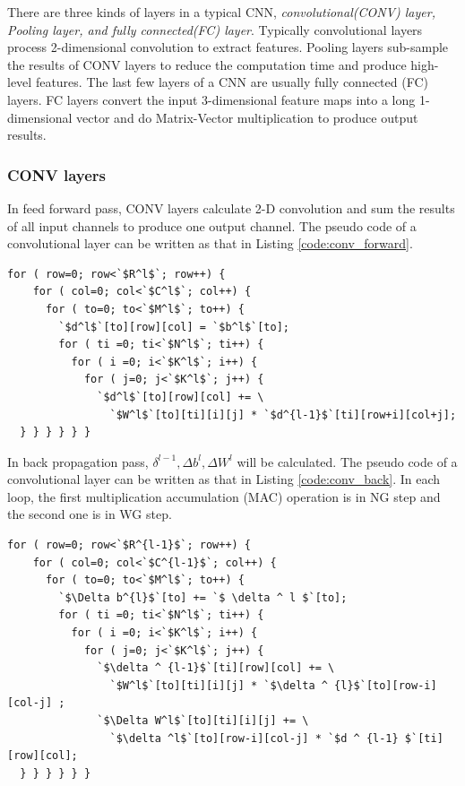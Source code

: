 There are three kinds of layers in a typical CNN, \textit{convolutional(CONV) layer, Pooling layer, and fully connected(FC) layer}. Typically convolutional layers process 2-dimensional convolution to extract features. Pooling layers sub-sample the results of CONV layers to reduce the computation time and produce high-level features. The last few layers of a CNN are usually fully connected (FC) layers. FC layers convert the input 3-dimensional feature maps into a long 1-dimensional vector and do Matrix-Vector multiplication to produce output results.
  
\subsubsection{CONV layers}
In feed forward pass, CONV layers calculate 2-D convolution and sum the results of all input channels to produce one output channel. The pseudo code of a convolutional layer can be written as that in Listing \ref{code:conv_forward}.
  
\begin{minipage}{\linewidth}
\begin{lstlisting}[caption=Conv Forward, label=code:conv_forward]  
  for ( row=0; row<`$R^l$`; row++) { 
    for ( col=0; col<`$C^l$`; col++) { 
      for ( to=0; to<`$M^l$`; to++) { 
        `$d^l$`[to][row][col] = `$b^l$`[to];
        for ( ti =0; ti<`$N^l$`; ti++) { 
          for ( i =0; i<`$K^l$`; i++) { 
            for ( j=0; j<`$K^l$`; j++) {
              `$d^l$`[to][row][col] += \
                `$W^l$`[to][ti][i][j] * `$d^{l-1}$`[ti][row+i][col+j];
  } } } } } }

\end{lstlisting}
\end{minipage}

In back propagation pass, $\delta ^{l-1} , \Delta b^l, \Delta W^l$ will be calculated. The pseudo code of a convolutional layer can be written as that in Listing \ref{code:conv_back}. In each loop, the first multiplication accumulation (MAC) operation is in NG step and the second one is in WG step.
    
\begin{minipage}{\linewidth}
\begin{lstlisting}[caption=Conv Back propagation, label=code:conv_back]  
  for ( row=0; row<`$R^{l-1}$`; row++) { 
    for ( col=0; col<`$C^{l-1}$`; col++) { 
      for ( to=0; to<`$M^l$`; to++) { 
        `$\Delta b^{l}$`[to] += `$ \delta ^ l $`[to];
        for ( ti =0; ti<`$N^l$`; ti++) { 
          for ( i =0; i<`$K^l$`; i++) { 
            for ( j=0; j<`$K^l$`; j++) {
              `$\delta ^ {l-1}$`[ti][row][col] += \
                `$W^l$`[to][ti][i][j] * `$\delta ^ {l}$`[to][row-i][col-j] ;
              `$\Delta W^l$`[to][ti][i][j] += \
                `$\delta ^l$`[to][row-i][col-j] * `$d ^ {l-1} $`[ti][row][col];
  } } } } } }

\end{lstlisting}
\end{minipage}

